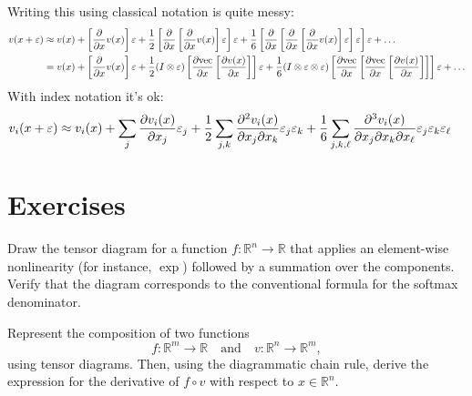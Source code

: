 Writing this using classical notation is quite messy:
\begin{align*}
    v(x + \varepsilon)
    &\approx
    v(x)
    + \left[\frac{\partial}{\partial x} v(x)\right]\varepsilon
    + \frac{1}{2}\left[\frac{\partial}{\partial x}\left[\frac{\partial}{\partial x} v(x)\right]\varepsilon\right]\varepsilon
    + \frac{1}{6}\left[\frac{\partial}{\partial x}\left[\frac{\partial}{\partial x} \left[\frac{\partial}{\partial x} v(x)\right]\varepsilon\right]\varepsilon\right]\varepsilon
    + \dots
    \\
    &=
    v(x)
    + \left[\frac{\partial}{\partial x} v(x)\right]\varepsilon
    +
    \frac{1}{2}
    (I \otimes \varepsilon)
    \left[\frac{\partial\mathrm{vec}}{\partial x}\left[\frac{\partial v(x)}{\partial x} \right]\right]\varepsilon
    + \frac{1}{6}
    (I \otimes \varepsilon \otimes \varepsilon)
    \left[\frac{\partial\mathrm{vec}}{\partial x}\left[\frac{\partial\mathrm{vec}}{\partial x} \left[\frac{\partial v(x)}{\partial x} \right]\right]\right]\varepsilon
    + \dots
\end{align*}
With index notation it's ok:
\begin{align*}
    v_i(x + \varepsilon)
    &\approx
    v_i(x)
    + \sum_j \frac{\partial v_i(x)}{\partial x_j} \varepsilon_j
    + \frac12 \sum_{j,k} \frac{\partial^2 v_i(x)}{\partial x_j\partial x_k} \varepsilon_j \varepsilon_k
   + \frac16 \sum_{j,k,\ell} \frac{\partial^3 v_i(x)}{\partial x_j\partial x_k\partial x_\ell} \varepsilon_j \varepsilon_k \varepsilon_\ell
\end{align*}



\section{Exercises}
\begin{exercise}
   Draw the tensor diagram for a function $f:\mathbb{R}^n\to\mathbb{R}$ that applies an element-wise nonlinearity (for instance, $\exp$) followed by a summation over the components. Verify that the diagram corresponds to the conventional formula for the softmax denominator.
\end{exercise}

\begin{exercise}
   Represent the composition of two functions 
   \[
      f:\mathbb{R}^m\to\mathbb{R} \quad \text{and} \quad v:\mathbb{R}^n\to\mathbb{R}^m,
   \]
   using tensor diagrams. Then, using the diagrammatic chain rule, derive the expression for the derivative of $f\circ v$ with respect to $x\in\mathbb{R}^n$.
\end{exercise}

